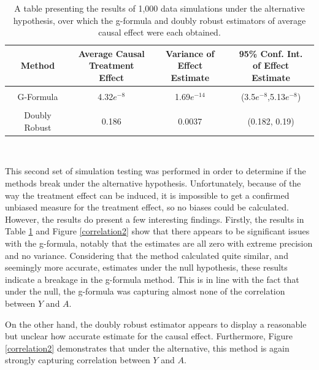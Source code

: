 \begin{table}[h!]
\centering
\begin{tabular}{c | c c c }
Method & \shortstack{Average Causal \\ Treatment Effect} & \shortstack{Variance of \\ Effect Estimate} & \shortstack{95\% Conf. Int.\\ of Effect Estimate} \\ 
\hline \\
G-Formula & 4.32$e^{-8}$ & 1.69$e^{-14}$ &(3.5$e^{-8}$,5.13$e^{-8}$) \\ \\ 
Doubly Robust & 0.186 & 0.0037  & (0.182, 0.19)
\end{tabular} \\
\centering
\caption[Simulation results under the alternative hypothesis]{A table presenting the results of 1,000 data simulations under the alternative hypothesis, over which the g-formula and doubly robust estimators of average causal effect were each obtained.\label{simdata2}}
\end{table}

This second set of simulation testing was performed in order to determine if the methods break under the alternative hypothesis.  Unfortunately, because of the way the treatment effect can be induced, it is impossible to get a confirmed unbiased measure for the treatment effect, so no biases could be calculated.  However, the results do present a few interesting findings.  Firstly, the results in Table \ref{simdata2} and Figure \ref{correlation2} show that there appears to be significant issues with the g-formula, notably that the estimates are all zero with extreme precision and no variance.  Considering that the method calculated quite similar, and seemingly more accurate, estimates under the null hypothesis, these results indicate a breakage in the g-formula method.  This is in line with the fact that under the null, the g-formula was capturing almost none of the correlation between $Y$ and $A$.  

On the other hand, the doubly robust estimator appears to display a reasonable but unclear how accurate estimate for the causal effect.  Furthermore, Figure \ref{correlation2} demonstrates that under the alternative, this method is again strongly capturing correlation between $Y$ and $A$.  


